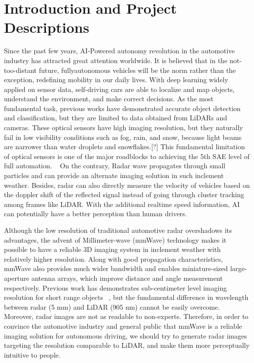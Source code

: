 \section{Introduction and Project Descriptions}


Since the past few years, AI-Powered autonomy revolution in the automotive industry has attracted great attention worldwide. It is believed that in the not-too-distant future, fullyautonomous vehicles will be the norm rather than the exception, redefining mobility in our daily lives. With deep learning widely applied on sensor data, self-driving cars are able to localize and map objects, understand the environment, and make correct decisions. As the most fundamental task, previous works have demonstrated accurate object detection and classification, but they are limited to data obtained from LiDARs and cameras. These optical sensors have high imaging resolution, but they naturally fail in low visibility conditions such as fog, rain, and snow, because light beams are narrower than water droplets and snowflakes.[?] This fundamental limitation of optical sensors is one of the major roadblocks to achieving the 5th SAE level of full automation. ~\cite{SAE} On the contrary, Radar wave propagates through small particles and can provide an alternate imaging solution in such inclement weather. Besides, radar can also directly measure the velocity of vehicles based on the doppler shift of the reflected signal instead of going through cluster tracking among frames like LiDAR. With the additional realtime speed information, AI can potentially have a better perception than human drivers.

Although the low resolution of traditional automotive radar overshadows its advantages, the advent of Millimeter-wave (mmWave) technology makes it possible to have a reliable 3D imaging system in inclement weather with relatively higher resolution. Along with good propagation characteristics, mmWave also provides much wider bandwidth and enables miniature-sized large-aperture antenna arrays, which improve distance and angle measurement respectively. Previous work has demonstrates sub-centimeter level imaging resolution for short range objects ~\cite{mmWave_SAR}, but the fundamental difference in wavelength between radar (5 mm) and LiDAR (905 nm) cannot be easily overcome. Moreover, radar images are not as readable to non-experts. Therefore, in order to convince the automotive industry and general public that mmWave is a reliable imaging solution for autonomous driving, we should try to generate radar images targeting the resolution comparable to LiDAR, and make them more perceptually intuitive to people. 

